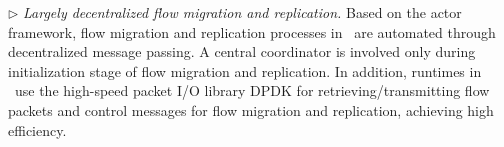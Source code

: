 

$\triangleright$ {\em Largely decentralized flow migration and replication.} Based on the actor framework, flow migration and replication processes in \nfactor~are automated through decentralized message passing. A central coordinator is involved only during initialization stage of flow migration and replication. %
 In addition, runtimes in \nfactor~use the high-speed packet I/O library DPDK \cite{dpdk} for retrieving/transmitting flow packets and control messages for flow migration and replication, achieving high efficiency.


